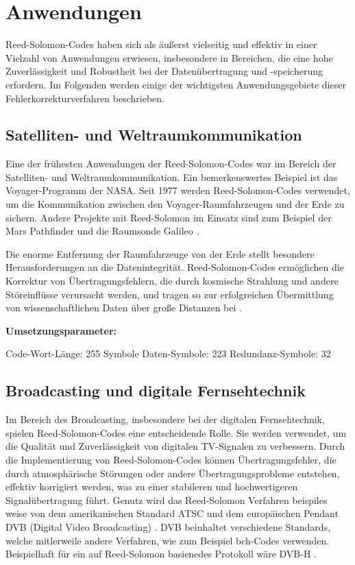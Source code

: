 \chapter{Anwendungen}\label{ch:application}

Reed-Solomon-Codes haben sich als äußerst vielseitig und effektiv in einer Vielzahl von Anwendungen erwiesen, insbesondere in Bereichen, die eine hohe Zuverlässigkeit und Robustheit bei der Datenübertragung und -speicherung erfordern. 
Im Folgenden werden einige der wichtigsten Anwendungsgebiete dieser Fehlerkorrekturverfahren beschrieben.

\section{Satelliten- und Weltraumkommunikation}

Eine der frühesten Anwendungen der Reed-Solomon-Codes war im Bereich der Satelliten- und Weltraumkommunikation. 
Ein bemerkenswertes Beispiel ist das Voyager-Programm der NASA. Seit 1977 werden Reed-Solomon-Codes verwendet, um die Kommunikation zwischen den Voyager-Raumfahrzeugen und der Erde zu sichern. 
Andere Projekte mit Reed-Solomon im Einsatz sind zum Beispiel der Mars Pathfinder und die Raumsonde Galileo \cite{wickerReedSolomonCodes1994}.

Die enorme Entfernung der Raumfahrzeuge von der Erde stellt besondere Herausforderungen an die Datenintegrität. 
Reed-Solomon-Codes ermöglichen die Korrektur von Übertragungsfehlern, die durch kosmische Strahlung und andere Störeinflüsse verursacht werden, und tragen so zur erfolgreichen Übermittlung von wissenschaftlichen Daten über große Distanzen bei \cite{ludwigVoyagerTelecommunications2002}.

\textbf{Umsetzungsparameter:}

Code-Wort-Länge: 255 Symbole
Daten-Symbole: 223
Redundanz-Symbole: 32

\section{Broadcasting und digitale Fernsehtechnik}

Im Bereich des Broadcasting, insbesondere bei der digitalen Fernsehtechnik, spielen Reed-Solomon-Codes eine entscheidende Rolle. 
Sie werden verwendet, um die Qualität und Zuverlässigkeit von digitalen TV-Signalen zu verbessern. 
Durch die Implementierung von Reed-Solomon-Codes können Übertragungsfehler, die durch atmosphärische Störungen oder andere Übertragungsprobleme entstehen, effektiv korrigiert werden, was zu einer stabileren und hochwertigeren Signalübertragung führt.
Genutz wird das Reed-Solomon Verfahren beispiles weise von dem amerikanischen Standard ATSC und dem europäischen Pendant DVB (Digital Video Broadcasting) \cite{ilievAnalysisEvaluationReedSolomon2008}.
DVB beinhaltet verschiedene Standards, welche mitlerweile andere Verfahren, wie zum Beispiel \acrshort{bch}-Codes verwenden. 
Beispielhaft für ein auf Reed-Solomon basienedes Protokoll wäre DVB-H \cite{DVBH2024}. 


